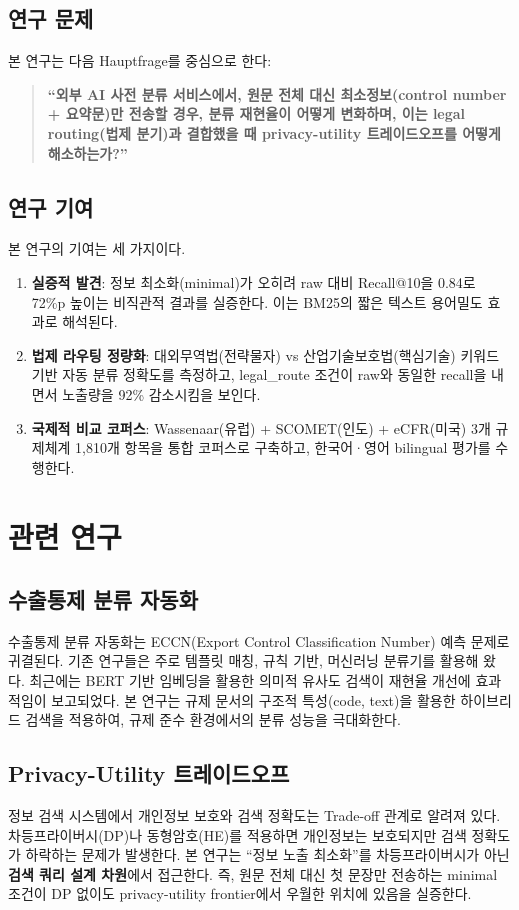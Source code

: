 \documentclass[11pt,a4paper]{article}
\begin{document}
\subsection{연구 문제}
본 연구는 다음 Hauptfrage를 중심으로 한다:

\begin{quote}
\textbf{``외부 AI 사전 분류 서비스에서, 원문 전체 대신 최소정보(control number + 요약문)만 전송할 경우, 분류 재현율이 어떻게 변화하며, 이는 legal routing(법제 분기)과 결합했을 때 privacy-utility 트레이드오프를 어떻게 해소하는가?''}
\end{quote}

\subsection{연구 기여}
본 연구의 기여는 세 가지이다.

\begin{enumerate}
\item \textbf{실증적 발견}: 정보 최소화(minimal)가 오히려 raw 대비 Recall@10을 0.84로 72\%p 높이는 비직관적 결과를 실증한다. 이는 BM25의 짧은 텍스트 용어밀도 효과로 해석된다.
\item \textbf{법제 라우팅 정량화}: 대외무역법(전략물자) vs 산업기술보호법(핵심기술) 키워드 기반 자동 분류 정확도를 측정하고, legal\_route 조건이 raw와 동일한 recall을 내면서 노출량을 92\% 감소시킴을 보인다.
\item \textbf{국제적 비교 코퍼스}: Wassenaar(유럽) + SCOMET(인도) + eCFR(미국) 3개 규제체계 1,810개 항목을 통합 코퍼스로 구축하고, 한국어·영어 bilingual 평가를 수행한다.
\end{enumerate}

\section{관련 연구}
\label{sec:related}

\subsection{수출통제 분류 자동화}
수출통제 분류 자동화는 ECCN(Export Control Classification Number) 예측 문제로 귀결된다. 기존 연구들은 주로 템플릿 매칭, 규칙 기반, 머신러닝 분류기를 활용해 왔다. 최근에는 BERT 기반 임베딩을 활용한 의미적 유사도 검색이 재현율 개선에 효과적임이 보고되었다. 본 연구는 규제 문서의 구조적 특성(code, text)을 활용한 하이브리드 검색을 적용하여, 규제 준수 환경에서의 분류 성능을 극대화한다.

\subsection{Privacy-Utility 트레이드오프}
정보 검색 시스템에서 개인정보 보호와 검색 정확도는 Trade-off 관계로 알려져 있다. 차등프라이버시(DP)나 동형암호(HE)를 적용하면 개인정보는 보호되지만 검색 정확도가 하락하는 문제가 발생한다. 본 연구는 ``정보 노출 최소화''를 차등프라이버시가 아닌 \textbf{검색 쿼리 설계 차원}에서 접근한다. 즉, 원문 전체 대신 첫 문장만 전송하는 minimal 조건이 DP 없이도 privacy-utility frontier에서 우월한 위치에 있음을 실증한다.
\end{document}
